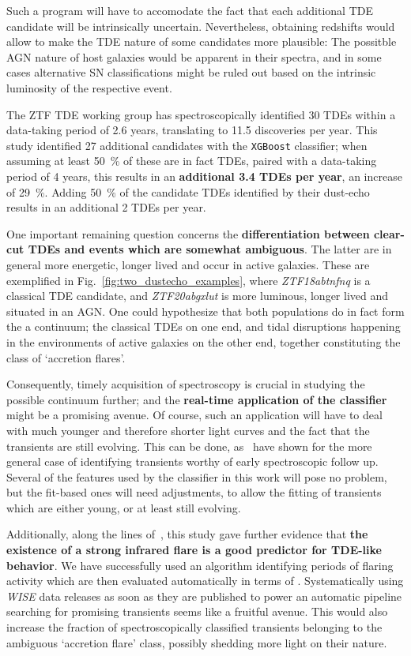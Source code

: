 Such a program will have to accomodate the fact that each additional TDE candidate will be intrinsically uncertain. Nevertheless, obtaining redshifts would allow to make the TDE nature of some candidates more plausible: The possitble AGN nature of host galaxies would be apparent in their spectra, and in some cases alternative SN classifications might be ruled out based on the intrinsic luminosity of the respective event.

The ZTF TDE working group has spectroscopically identified 30 TDEs within a data-taking period of 2.6 years, translating to 11.5 discoveries per year. This study identified 27 additional candidates with the \texttt{XGBoost} classifier; when assuming at least \SI{50}{\percent} of these are in fact TDEs, paired with a data-taking period of 4 years, this results in an \textbf{additional 3.4 TDEs per year}, an increase of \SI{29}{\percent}. Adding \SI{50}{\percent} of the candidate TDEs identified by their dust-echo results in an additional 2 TDEs per year.

One important remaining question concerns the \textbf{differentiation between clear-cut TDEs and events which are somewhat ambiguous}. The latter are in general more energetic, longer lived and occur in active galaxies. These are exemplified in Fig.~\ref{fig:two_dustecho_examples}, where \textit{ZTF18abtnfnq} is a classical TDE candidate, and \textit{ZTF20abgxlut} is more luminous, longer lived and situated in an AGN. One could hypothesize that both populations do in fact form the a continuum; the classical TDEs on one end, and tidal disruptions happening in the environments of active galaxies on the other end, together constituting the class of `accretion flares'.

Consequently, timely acquisition of spectroscopy is crucial in studying the possible continuum further; and the \textbf{real-time application of the classifier} might be a promising avenue. Of course, such an application will have to deal with much younger and therefore shorter light curves and the fact that the transients are still evolving. This can be done, as~ have shown for the more general case of identifying transients worthy of early spectroscopic follow up. Several of the features used by the classifier in this work will pose no problem, but the fit-based ones will need adjustments, to allow the fitting of transients which are either young, or at least still evolving.

Additionally, along the lines of~\cite{Velzen2021}, this study gave further evidence that \textbf{the existence of a strong infrared flare is a good predictor for TDE-like behavior}. We have successfully used an algorithm identifying periods of flaring activity which are then evaluated automatically in terms of . Systematically using \textit{WISE} data releases as soon as they are published to power an automatic pipeline searching for promising transients seems like a fruitful avenue. This would also increase the fraction of spectroscopically classified transients belonging to the ambiguous `accretion flare' class, possibly shedding more light on their nature.


